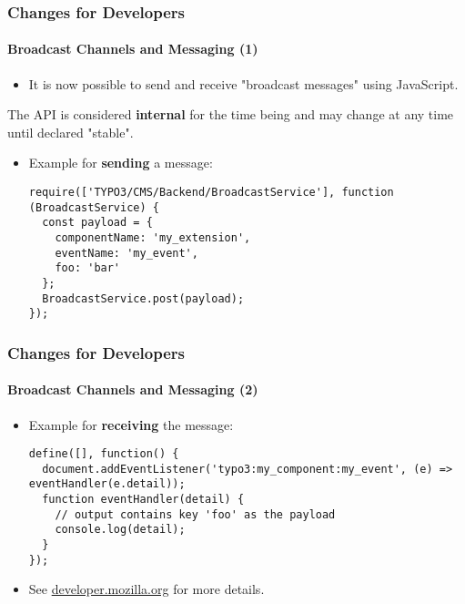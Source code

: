 \begin{frame}[fragile]
	\frametitle{Changes for Developers}
	\framesubtitle{Broadcast Channels and Messaging (1)}

	\lstset{basicstyle=\tiny\ttfamily}

	\begin{itemize}
		\item It is now possible to send and receive "broadcast messages" using JavaScript.
	\end{itemize}

	\vspace{-0.2cm}
	\begingroup
		\color{red}
			\begin{center}
				The API is considered \textbf{internal} for the time being\newline
				and may change at any time until declared "stable".
			\end{center}
	\endgroup

	\begin{itemize}
		\item Example for \textbf{sending} a message:

\begin{lstlisting}
require(['TYPO3/CMS/Backend/BroadcastService'], function (BroadcastService) {
  const payload = {
    componentName: 'my_extension',
    eventName: 'my_event',
    foo: 'bar'
  };
  BroadcastService.post(payload);
});
\end{lstlisting}

	\end{itemize}

\end{frame}


\begin{frame}[fragile]
	\frametitle{Changes for Developers}
	\framesubtitle{Broadcast Channels and Messaging (2)}

	\lstset{basicstyle=\tiny\ttfamily}

	\begin{itemize}
		\item Example for \textbf{receiving} the message:

\begin{lstlisting}
define([], function() {
  document.addEventListener('typo3:my_component:my_event', (e) => eventHandler(e.detail));
  function eventHandler(detail) {
    // output contains key 'foo' as the payload
    console.log(detail);
  }
});
\end{lstlisting}

		\item See \href{https://developer.mozilla.org/en-US/docs/Web/API/Broadcast_Channel_API}{developer.mozilla.org} for more details.

	\end{itemize}

\end{frame}

